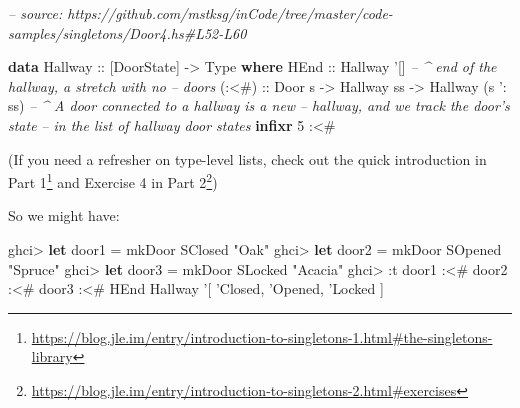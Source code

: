 \documentclass[]{article}
\newenvironment{Shaded}{}{}
\newcommand{\CommentTok}[1]{\textcolor[rgb]{0.38,0.63,0.69}{\textit{#1}}}
\newcommand{\DataTypeTok}[1]{\textcolor[rgb]{0.56,0.13,0.00}{#1}}
\newcommand{\DecValTok}[1]{\textcolor[rgb]{0.25,0.63,0.44}{#1}}
\newcommand{\FunctionTok}[1]{\textcolor[rgb]{0.02,0.16,0.49}{#1}}
\newcommand{\KeywordTok}[1]{\textcolor[rgb]{0.00,0.44,0.13}{\textbf{#1}}}
\newcommand{\NormalTok}[1]{#1}
\newcommand{\OtherTok}[1]{\textcolor[rgb]{0.00,0.44,0.13}{#1}}
\newcommand{\StringTok}[1]{\textcolor[rgb]{0.25,0.44,0.63}{#1}}
\renewcommand{\href}[2]{#2\footnote{\url{#1}}}
\begin{document}
\begin{Shaded}
\begin{Highlighting}[]
\CommentTok{-- source: https://github.com/mstksg/inCode/tree/master/code-samples/singletons/Door4.hs#L52-L60}

\KeywordTok{data} \DataTypeTok{Hallway}\OtherTok{ ::}\NormalTok{ [}\DataTypeTok{DoorState}\NormalTok{] }\OtherTok{->} \DataTypeTok{Type} \KeywordTok{where}
    \DataTypeTok{HEnd}\OtherTok{  ::} \DataTypeTok{Hallway}\NormalTok{ '[]        }\CommentTok{-- ^ end of the hallway, a stretch with no}
                                \CommentTok{--   doors}
\OtherTok{    (:<#) ::} \DataTypeTok{Door}\NormalTok{ s}
          \OtherTok{->} \DataTypeTok{Hallway}\NormalTok{ ss}
          \OtherTok{->} \DataTypeTok{Hallway}\NormalTok{ (s '}\FunctionTok{:}\NormalTok{ ss)  }\CommentTok{-- ^ A door connected to a hallway is a new}
                                \CommentTok{--   hallway, and we track the door's state}
                                \CommentTok{--   in the list of hallway door states}
\KeywordTok{infixr} \DecValTok{5} \FunctionTok{:<#}
\end{Highlighting}
\end{Shaded}

(If you need a refresher on type-level lists, check out
\href{https://blog.jle.im/entry/introduction-to-singletons-1.html\#the-singletons-library}{the
quick introduction in Part 1} and
\href{https://blog.jle.im/entry/introduction-to-singletons-2.html\#exercises}{Exercise
4 in Part 2})

So we might have:

\begin{Shaded}
\begin{Highlighting}[]
\NormalTok{ghci}\FunctionTok{>} \KeywordTok{let}\NormalTok{ door1 }\FunctionTok{=}\NormalTok{ mkDoor }\DataTypeTok{SClosed} \StringTok{"Oak"}
\NormalTok{ghci}\FunctionTok{>} \KeywordTok{let}\NormalTok{ door2 }\FunctionTok{=}\NormalTok{ mkDoor }\DataTypeTok{SOpened} \StringTok{"Spruce"}
\NormalTok{ghci}\FunctionTok{>} \KeywordTok{let}\NormalTok{ door3 }\FunctionTok{=}\NormalTok{ mkDoor }\DataTypeTok{SLocked} \StringTok{"Acacia"}
\NormalTok{ghci}\FunctionTok{>} \FunctionTok{:}\NormalTok{t door1 }\FunctionTok{:<#}\NormalTok{ door2 }\FunctionTok{:<#}\NormalTok{ door3 }\FunctionTok{:<#} \DataTypeTok{HEnd}
\DataTypeTok{Hallway}\NormalTok{ '[ '}\DataTypeTok{Closed}\NormalTok{, '}\DataTypeTok{Opened}\NormalTok{, '}\DataTypeTok{Locked}\NormalTok{ ]}
\end{Highlighting}
\end{Shaded}
\end{document}

